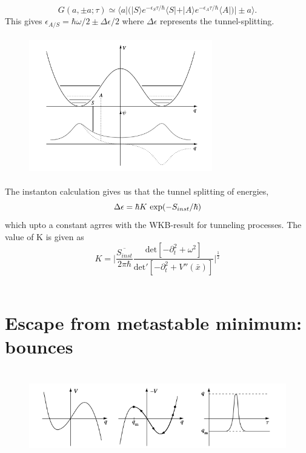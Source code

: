 \documentclass[a4paper, 12pt]{article}
\begin{document}
\begin{equation}
G(a,\pm a;\tau) \simeq \langle a| \bigg( |S\rangle e^{-\epsilon_S \tau /\hbar} \langle S| + |A\rangle e^{-\epsilon_A \tau /\hbar} \langle A|   \bigg) |\pm a\rangle.
\end{equation}
This gives $\epsilon_{A/S}=\hbar \omega /2 \pm \Delta \epsilon /2$ where $\Delta \epsilon$ represents the tunnel-splitting.
\begin{figure}[ht]
    \centering
    \includegraphics[height=6cm, width=8cm]{fig4}
\end{figure}

The instanton calculation gives us that the tunnel splitting of energies,
\begin{equation}
\Delta \epsilon = \hbar K \*\ \mathrm{exp}(-S_{inst}/\hbar)
\end{equation}
which upto a constant agrres with the WKB-result for tunneling processes. The value of K is given as
\begin{equation}
K = \bigg| {\frac{\overline{S_{inst}}}{2\pi \hbar}} \frac{\mathrm{det}[-\partial_t^2 + \omega^2]}{\mathrm{det'}[-\partial_t^2 + V''(\bar{x})]}\bigg|^{\frac{1}{2}}
\end{equation}
\\
\section {Escape from metastable minimum: bounces}


\begin{figure}[ht]
    \centering
    \includegraphics[height=4cm, width=15cm]{fig5}
\end{figure}
\end{document}
